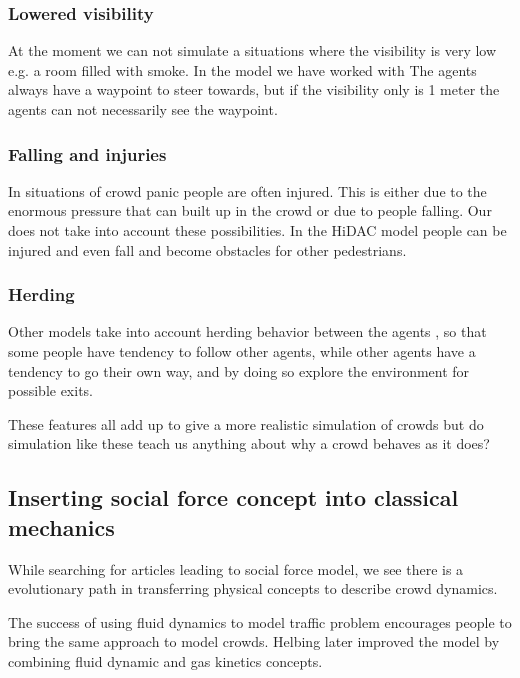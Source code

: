 \subsubsection{Lowered visibility}
At the moment we can not simulate a situations where the visibility is very low 
e.g. a room filled with smoke. In the model we have worked with The agents always 
have a waypoint to steer towards, but if the visibility only is 1 meter the 
agents can not necessarily see the waypoint. \cite{HelbingNew}

\subsubsection{Falling and injuries}
In situations of crowd panic people are often injured. This is either due to the 
enormous pressure that can built up in the crowd or due to people falling. Our 
does not take into account these possibilities. In the HiDAC model people can 
be injured and even fall and become obstacles for other pedestrians.\cite{HiDAC}

\subsubsection{Herding}
Other models take into account herding behavior between the agents  
\cite{helbing00}, so that some people have tendency to follow other agents, 
while other agents have a tendency to go their own way,  and by doing so 
explore the environment for possible exits.

These features all add up to give a more realistic simulation of crowds 
but do simulation like these teach us anything about why a crowd behaves 
as it does?

\subsection{Inserting social force concept into classical mechanics}
\label{subsec:development}
While searching for articles leading to social force model, we see there is a 
evolutionary path in transferring physical concepts to describe crowd dynamics.

The success of using fluid dynamics to model traffic problem encourages 
people to bring the same approach to model crowds. Helbing later improved the  
model by combining fluid dynamic and gas kinetics concepts\cite{social-force}. 

